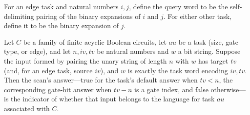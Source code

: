 \begin{definition}
\label{BoolCircuit.AdjScan.word}
\leanok
{}
For an edge task and natural numbers $i,j$, define the query word to be the
self-delimiting pairing of the binary expansions of $i$ and $j$. For either other task,
define it to be the binary expansion of $j$.
\end{definition}

\begin{lemma}
\label{BoolCircuit.AdjScan.answer_eq}
\leanok
{}
Let $C$ be a family of finite acyclic Boolean circuits, let $	au$ be a task (size, gate
type, or edge), and let $n,iv,tv$ be natural numbers and $w$ a bit string. Suppose the
input formed by pairing the unary string of length $n$ with $w$ has target $tv$ (and,
for an edge task, source $iv$), and $w$ is exactly the task word encoding $iv,tv$. Then
the scan's answer—true for the task's default answer when $tv<n$, the corresponding
gate-hit answer when $tv-n$ is a gate index, and false otherwise—is the indicator of
whether that input belongs to the language for task $	au$ associated with $C$.
\end{lemma}

